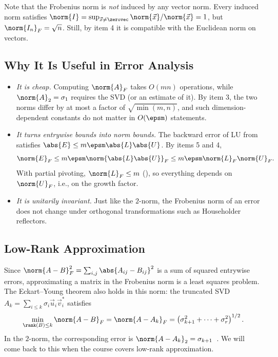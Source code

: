 Note that the Frobenius norm is \emph{not} induced by any vector norm. Every induced norm satisfies $\norm{I} = \sup_{\vec{x} \ne \zerovec}\norm{\vec{x}}/\norm{\vec{x}} = 1$, but $\norm{I_n}_F = \sqrt{n}$. Still, by item 4 it is compatible with the Euclidean norm on vectors.

\subsection{Why It Is Useful in Error Analysis}

\begin{itemize}
  \item \emph{It is cheap.} Computing $\norm{A}_F$ takes $O(mn)$ operations, while $\norm{A}_2 = \sigma_1$ requires the SVD (or an estimate of it). By item 3, the two norms differ by at most a factor of $\sqrt{\min(m, n)}$, and such dimension-dependent constants do not matter in $O(\epsm)$ statements.
  \item \emph{It turns entrywise bounds into norm bounds.} The backward error of LU from  satisfies $\abs{E} \le m\epsm\abs{L}\abs{U}$. By items 5 and 4,
  \begin{equation}
    \norm{E}_F \le m\epsm\norm{\abs{L}\abs{U}}_F \le m\epsm\norm{L}_F\norm{U}_F.
  \end{equation}
  With partial pivoting, $\norm{L}_F \le m$ (), so everything depends on $\norm{U}_F$, i.e., on the growth factor.
  \item \emph{It is unitarily invariant.} Just like the $2$-norm, the Frobenius norm of an error does not change under orthogonal transformations such as Householder reflectors.
\end{itemize}

\subsection{Low-Rank Approximation}

Since $\norm{A - B}_F^2 = \sum_{i,j}\abs{A_{ij} - B_{ij}}^2$ is a sum of squared entrywise errors, approximating a matrix in the Frobenius norm is a least squares problem. The Eckart--Young theorem also holds in this norm: the truncated SVD $A_k = \sum_{i \le k}\sigma_i\vec{u}_i\vec{v}_i^\ast$ satisfies
\begin{equation}
  \min_{\rank(B) \le k}\norm{A - B}_F = \norm{A - A_k}_F = \left(\sigma_{k+1}^2 + \cdots + \sigma_r^2\right)^{1/2}.
\end{equation}
In the $2$-norm, the corresponding error is $\norm{A - A_k}_2 = \sigma_{k+1}$~\cite[\S3.2.3]{Demmel}. We will come back to this when the course covers low-rank approximation.

